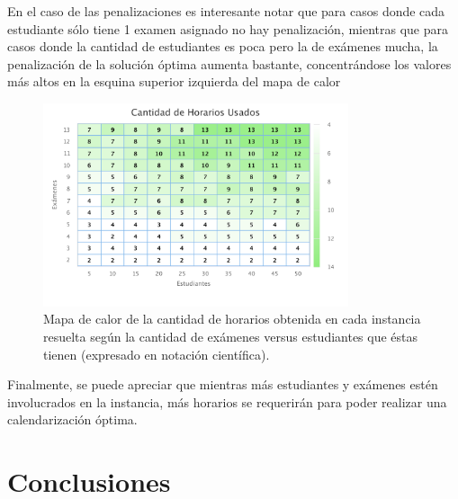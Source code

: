 \documentclass[letter, 10pt]{article}
\begin{document}
En el caso de las penalizaciones es interesante notar que para casos donde cada estudiante sólo tiene 1 examen asignado no hay penalización, mientras que para casos donde la cantidad de estudiantes es poca pero la de exámenes mucha, la penalización de la solución óptima aumenta bastante, concentrándose los valores más altos en la esquina superior izquierda del mapa de calor

\begin{figure}[H]
\begin{center}
\includegraphics[width=0.8\textwidth]{img/g7.pdf}
\end{center}
\caption{Mapa de calor de la cantidad de horarios obtenida en cada instancia resuelta según la cantidad de exámenes versus estudiantes que éstas tienen (expresado en notación científica).}
\label{fig:g6}
\end{figure}

Finalmente, se puede apreciar que mientras más estudiantes y exámenes estén involucrados en la instancia, más horarios se requerirán para poder realizar una calendarización óptima.

\section{Conclusiones} \label{conclusiones}
\end{document}

